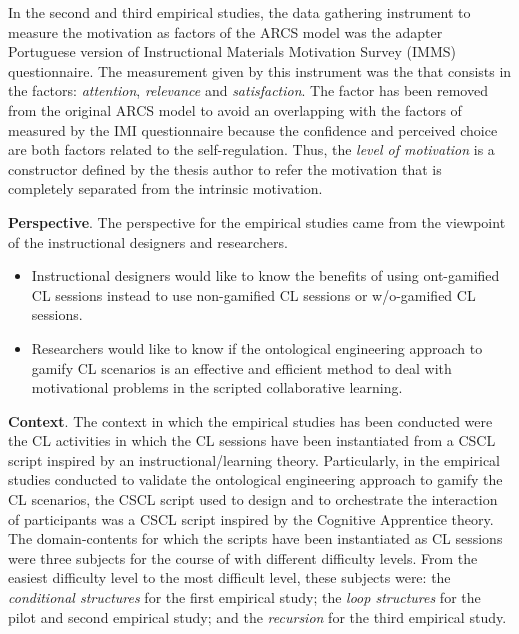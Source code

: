 In the second and third empirical studies, the data gathering instrument to measure the motivation as factors of the ARCS model was the adapter Portuguese version of Instructional Materials Motivation Survey (IMMS) questionnaire.
The measurement given by this instrument was the  that consists in the factors: \emph{attention}, \emph{relevance} and \emph{satisfaction}.
The  factor has been removed from the original ARCS model to avoid an overlapping with the factors of  measured by the IMI questionnaire because the confidence and perceived choice are both factors related to the self-regulation.
Thus, the \emph{level of motivation} is a constructor defined by the thesis author to refer the motivation that is completely separated from the intrinsic motivation.

\textbf{Perspective}.
The perspective for the empirical studies came from the viewpoint of the instructional designers and researchers.

\begin{itemize}
\item
Instructional designers would like to know the benefits of using ont-gamified CL sessions instead to use non-gamified CL sessions or w/o-gamified CL sessions.

\item
Researchers would like to know if the ontological engineering approach to gamify CL scenarios is an effective and efficient method to deal with motivational problems in the scripted collaborative learning.
\end{itemize}

\textbf{Context}.
The context in which the empirical studies has been conducted were the CL activities in which the CL sessions have been instantiated from a CSCL script inspired by an instructional/learning theory.
Particularly, in the empirical studies conducted to validate the ontological engineering approach to gamify the CL scenarios, the CSCL script used to design and to orchestrate the interaction of participants was a CSCL script inspired by the Cognitive Apprentice theory.
The domain-contents for which the scripts have been instantiated as CL sessions were three subjects for the course of  with different difficulty levels.
From the easiest difficulty level to the most difficult level, these subjects were:
the \emph{conditional structures} for the first empirical study;
the \emph{loop structures} for the pilot and second empirical study; and
the \emph{recursion} for the third empirical study.

